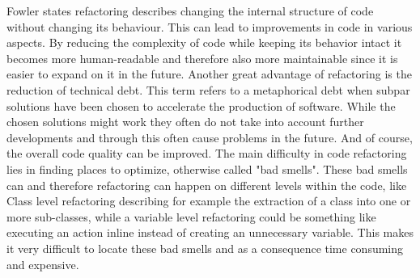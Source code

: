 Fowler states refactoring describes changing the internal structure of code without changing its behaviour.\cite{fowler2018refactoring} 
This can lead to improvements in code in various aspects. By reducing the complexity of code while keeping its behavior intact it becomes more human-readable and therefore also more maintainable since it is easier to expand on it in the future. \cite{kaur2016analysis}
Another great advantage of refactoring is the reduction of technical debt. This term refers to a metaphorical debt when subpar solutions have been chosen to accelerate the production of software. While the chosen solutions might work they often do not take into account further developments and through this often cause problems in the future. \cite{techdebt}
And of course, the overall code quality can be improved.
The main difficulty in code refactoring lies in finding places to optimize, otherwise called "bad smells". These bad smells can and therefore refactoring can happen on different levels within the code, like Class level refactoring describing for example the extraction of a class into one or more sub-classes, while a variable level refactoring could be something like executing an action inline instead of creating an unnecessary variable. \cite{aniche2020effectiveness} This makes it very difficult to locate these bad smells and as a consequence time consuming and expensive.